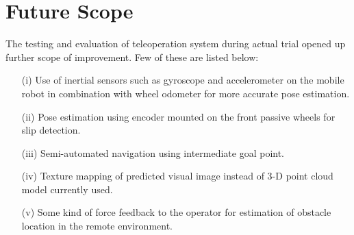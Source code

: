 \section{Future Scope }
The testing and evaluation of teleoperation system during actual trial opened up  further scope of improvement. Few of these are listed below:  
\begin{itemize}
	\item [(i)] Use of inertial sensors such as gyroscope and accelerometer  on the mobile robot  in combination with wheel odometer for more accurate  pose estimation.   
	
	\item[(ii)]  Pose estimation using encoder mounted on the front passive wheels for slip detection.
	
	\item[(iii)] Semi-automated navigation using intermediate goal point.  
	
	\item[(iv)] Texture mapping of predicted  visual image instead of 3-D point cloud model currently used.
	\item [(v)] Some kind of force feedback to the operator for estimation of obstacle location in the remote environment.
\end{itemize}	
